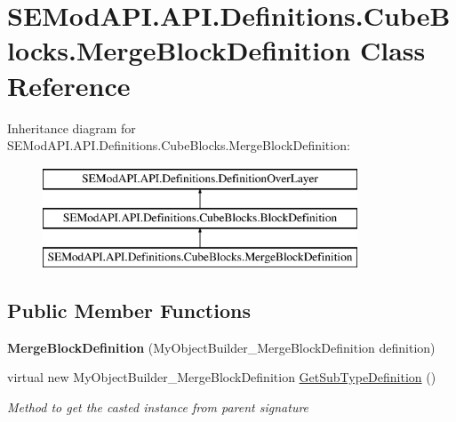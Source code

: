 \hypertarget{class_s_e_mod_a_p_i_1_1_a_p_i_1_1_definitions_1_1_cube_blocks_1_1_merge_block_definition}{}\section{S\+E\+Mod\+A\+P\+I.\+A\+P\+I.\+Definitions.\+Cube\+Blocks.\+Merge\+Block\+Definition Class Reference}
\label{class_s_e_mod_a_p_i_1_1_a_p_i_1_1_definitions_1_1_cube_blocks_1_1_merge_block_definition}
Inheritance diagram for S\+E\+Mod\+A\+P\+I.\+A\+P\+I.\+Definitions.\+Cube\+Blocks.\+Merge\+Block\+Definition\+:\begin{figure}[H]
\begin{center}
\leavevmode
\includegraphics[height=3.000000cm]{class_s_e_mod_a_p_i_1_1_a_p_i_1_1_definitions_1_1_cube_blocks_1_1_merge_block_definition}
\end{center}
\end{figure}
\subsection*{Public Member Functions}
\begin{DoxyCompactItemize}
\item 
\hypertarget{class_s_e_mod_a_p_i_1_1_a_p_i_1_1_definitions_1_1_cube_blocks_1_1_merge_block_definition_a94f9ace92c6b73598842fc7e16a01177}{}{\bfseries Merge\+Block\+Definition} (My\+Object\+Builder\+\_\+\+Merge\+Block\+Definition definition)\label{class_s_e_mod_a_p_i_1_1_a_p_i_1_1_definitions_1_1_cube_blocks_1_1_merge_block_definition_a94f9ace92c6b73598842fc7e16a01177}

\item 
virtual new My\+Object\+Builder\+\_\+\+Merge\+Block\+Definition \hyperlink{class_s_e_mod_a_p_i_1_1_a_p_i_1_1_definitions_1_1_cube_blocks_1_1_merge_block_definition_a76ffc5f67be70d1d660eb6774f64bd47}{Get\+Sub\+Type\+Definition} ()
\begin{DoxyCompactList}\small\item\em Method to get the casted instance from parent signature \end{DoxyCompactList}\end{DoxyCompactItemize}
